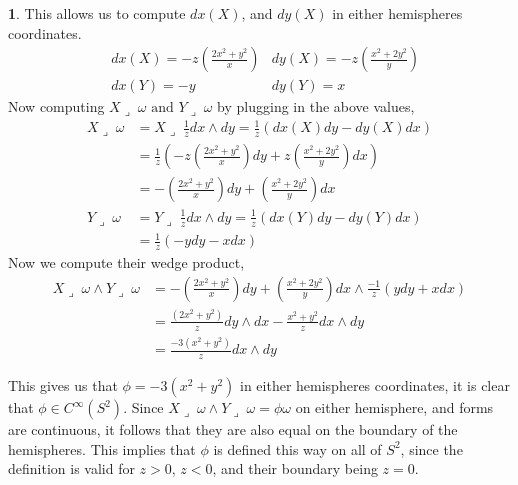 \documentclass[10.5pt]{article}
\theoremstyle{definition}
\newtheorem{pb}{}
\newcommand{\tand}{\text{ and }}
\newcommand{\hook}{\lrcorner\;}
\begin{document}
\begin{pb}
        This allows us to compute \(dx(X)\), and \(dy(X)\) in either hemispheres coordinates.
        \begin{align*}
            &dx(X) = -z\left(\frac{2x^2 + y^2}{x}\right) &dy(X) = -z\left(\frac{x^2 + 2y^2}{y}\right)\\
            &dx(Y) = -y &dy(Y) = x
        \end{align*}
        Now computing \(X \hook \omega \tand Y \hook \omega\) by plugging in the above values,
        \begin{align*}
            X \hook \omega &= X \hook \frac{1}{z}dx \wedge dy 
            = \frac{1}{z}(dx(X)dy - dy(X)dx) \\
            &= \frac{1}{z}(-z\left(\frac{2x^2 + y^2}{x}\right)dy + z\left(\frac{x^2 + 2y^2}{y}\right)dx) \\
            &= -\left(\frac{2x^2 + y^2}{x}\right)dy + \left(\frac{x^2 + 2y^2}{y}\right)dx \\
            Y \hook \omega &= Y \hook \frac{1}{z}dx \wedge dy = \frac{1}{z}(dx(Y)dy - dy(Y)dx) \\
            &= \frac{1}{z}\left(-ydy -xdx\right)
        \end{align*}
        Now we compute their wedge product,
        \begin{align*}
            X \hook \omega \wedge Y \hook \omega &= -\left(\frac{2x^2 + y^2}{x}\right)dy + \left(\frac{x^2 + 2y^2}{y}\right)dx \wedge \frac{-1}{z}(ydy + xdx) \\
            &= \frac{(2x^2 +y^2)}{z}dy \wedge dx - \frac{x^2 + y^2}{z} dx \wedge dy \\
            &= \frac{-3(x^2 + y^2)}{z}dx \wedge dy
        \end{align*}

        This gives us that \(\phi = -3(x^2 + y^2)\) in either hemispheres coordinates, it is clear that \(\phi \in C^\infty(S^2)\). Since \(X \hook \omega \wedge Y \hook \omega = \phi \omega\) on either hemisphere, and forms are continuous, it follows that they are also equal on the boundary of the hemispheres. This implies that \(\phi\) is defined this way on all of \(S^2\), since the definition is valid for \(z > 0\), \(z < 0\), and their boundary being \(z = 0\).
    \end{pb}
\end{document}
